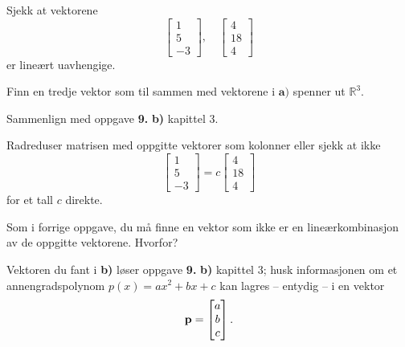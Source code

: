 \begin{oppgave}

\begin{punkt}
Sjekk at vektorene $$\begin{bmatrix}
1\\
5\\
-3
\end{bmatrix}, \quad \begin{bmatrix}
4\\
18\\
4
\end{bmatrix}$$ er lineært uavhengige.
\end{punkt}

\begin{punkt}
Finn en tredje vektor som til sammen med vektorene i $\textbf{a)}$ spenner ut $\mathbb{R}^3$.
\end{punkt}

\begin{punkt}
Sammenlign med oppgave \textbf{9.} \textbf{b)} kapittel 3.
\end{punkt}

\end{oppgave}

\begin{losning}

\begin{punkt}
Radreduser matrisen med oppgitte vektorer som kolonner eller sjekk at ikke $$\begin{bmatrix}
1\\
5\\
-3
\end{bmatrix}=c\begin{bmatrix}
4\\
18\\
4
\end{bmatrix}$$ for et tall $c$ direkte.
\end{punkt}

\begin{punkt}
Som i forrige oppgave, du må finne en vektor som ikke er en lineærkombinasjon av de oppgitte vektorene. Hvorfor?
\end{punkt}

\begin{punkt}
Vektoren du fant i \textbf{b)} løser oppgave \textbf{9.} \textbf{b)} kapittel 3; husk informasjonen om et annengradspolynom $p(x)=ax^2+bx+c$ kan lagres -- entydig -- i en vektor $$\mathbf{p}=\begin{bmatrix}
a\\
b\\
c
\end{bmatrix}.$$
\end{punkt}

\end{losning}



